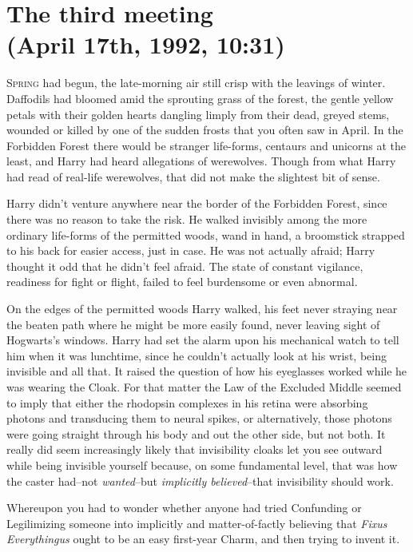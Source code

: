 
\section{The third meeting\\
(April 17th, 1992, 10:31\am)}

\lettrine{S}{pring} had begun, the late-morning air still crisp with the leavings of winter. Daffodils had bloomed amid the sprouting grass of the forest, the gentle yellow petals with their golden hearts dangling limply from their dead, greyed stems, wounded or killed by one of the sudden frosts that you often saw in April. In the Forbidden Forest there would be stranger life-forms, centaurs and unicorns at the least, and Harry had heard allegations of werewolves. Though from what Harry had read of real-life werewolves, that did not make the slightest bit of sense.

Harry didn't venture anywhere near the border of the Forbidden Forest, since there was no reason to take the risk. He walked invisibly among the more ordinary life-forms of the permitted woods, wand in hand, a broomstick strapped to his back for easier access, just in case. He was not actually afraid; Harry thought it odd that he didn't feel afraid. The state of constant vigilance, readiness for fight or flight, failed to feel burdensome or even abnormal.

On the edges of the permitted woods Harry walked, his feet never straying near the beaten path where he might be more easily found, never leaving sight of Hogwarts's windows. Harry had set the alarm upon his mechanical watch to tell him when it was lunchtime, since he couldn't actually look at his wrist, being invisible and all that. It raised the question of how his eyeglasses worked while he was wearing the Cloak. For that matter the Law of the Excluded Middle seemed to imply that either the rhodopsin complexes in his retina were absorbing photons and transducing them to neural spikes, or alternatively, those photons were going straight through his body and out the other side, but not both. It really did seem increasingly likely that invisibility cloaks let you see outward while being invisible yourself because, on some fundamental level, that was how the caster had\---not \emph{wanted}\---but \emph{implicitly believed}\---that invisibility should work.

Whereupon you had to wonder whether anyone had tried Confunding or Legilimizing someone into implicitly and matter-of-factly believing that \emph{Fixus Everythingus} ought to be an easy first-year Charm, and then trying to invent it.

